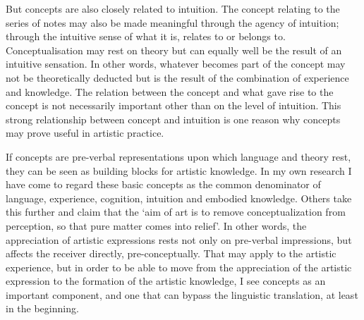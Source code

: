 \documentclass[12pt]{article}
\begin{document}
But concepts are also closely related to intuition. The concept relating to the series of notes may also be made meaningful through the agency of intuition; through the intuitive sense of what it is, relates to or belongs to. Conceptualisation may rest on theory but can equally well be the result of an intuitive sensation. In other words, whatever becomes part of the concept may not be theoretically deducted but is the result of the combination of experience and knowledge. The relation between the concept and what gave rise to the concept is not necessarily important other than on the level of intuition. This strong relationship between concept and intuition is one reason why concepts may prove useful in artistic practice.


If concepts are pre-verbal representations upon which language and theory rest, they can be seen as building blocks for artistic knowledge. In my own research I have come to regard these basic concepts as the common denominator of language, experience, cognition, intuition and embodied knowledge. Others take this further and claim that the `aim of art is to remove conceptualization from perception, so that pure matter comes into relief'. In other words, the appreciation of artistic expressions rests not only on pre-verbal impressions, but affects the receiver directly, pre-conceptually. That may apply to the artistic experience, but in order to be able to move from the appreciation of the artistic expression to the formation of the artistic knowledge, I see concepts as an important component, and one that can bypass the linguistic translation, at least in the beginning. 
\end{document}
